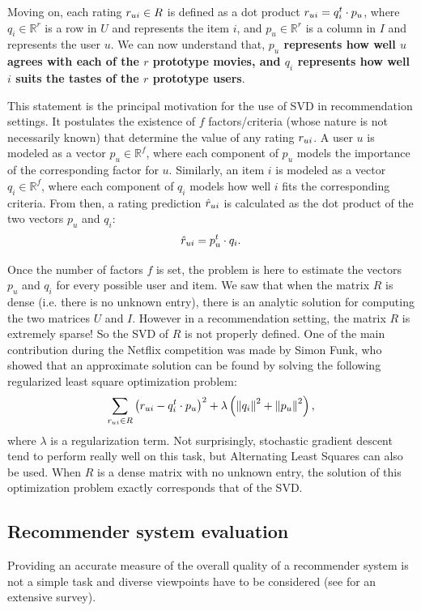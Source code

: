 Moving on, each rating $r_{ui} \in R$ is defined as a dot product $r_{ui} = q_i^t
\cdot p_u$, where $q_i \in \mathbb{R}^r$ is a row in $U$ and represents the
item $i$, and $p_u \in \mathbb{R}^r$ is a column in $I$ and represents the user
$u$. We can now understand that, \textbf{$p_u$ represents how well $u$ agrees
with each of the $r$ prototype movies, and $q_i$ represents how well $i$ suits
the tastes of the $r$ prototype users}.

This statement is the principal motivation for the use of SVD in recommendation
settings. It postulates the existence of $f$ factors/criteria (whose nature is
not necessarily known) that determine the value of any rating $r_{ui}$.  A user
$u$ is modeled as a vector $p_u \in \mathbb{R}^f$, where each component of
$p_u$ models the importance of the corresponding factor for $u$.  Similarly, an
item $i$ is modeled as a vector $q_i \in \mathbb{R}^f$, where each component of
$q_i$ models how well $i$ fits the corresponding criteria.  From then, a rating
prediction $\hat{r}_{ui}$ is calculated as the dot product of the two vectors $p_u$
and $q_i$:
$$\hat{r}_{ui} = p_u^t \cdot q_i.$$

Once the number of factors $f$ is set, the problem is here to estimate the
vectors $p_u$ and $q_i$ for every possible user and item. We saw that when the
matrix $R$ is dense (i.e. there is no unknown entry), there is an analytic
solution for computing the two matrices $U$ and $I$. However in a
recommendation setting, the matrix $R$ is extremely sparse! So the SVD of $R$
is not properly defined. One of the main contribution during the Netflix
competition was made by Simon Funk, who showed that an approximate solution can
be found by solving the following regularized least square optimization
problem:
$$
\sum_{r_{ui} \in R} \left(r_{ui} - q_i^t \cdot p_u \right)^2 +
\lambda\left({\left\lVert q_i\right\rVert}_{}^2 + {\left\lVert p_u\right\rVert}_{}^2\right),
$$
where $\lambda$ is a regularization term. Not surprisingly, stochastic gradient
descent tend to perform really well on this task, but Alternating Least Squares
can also be used. When $R$ is a dense matrix with no unknown entry, the
solution of this optimization problem exactly corresponds that of the SVD.


\subsection{Recommender system evaluation}
\label{SEC:Recommender_system_evaluation}
Providing an accurate measure of the overall quality of a recommender system is
not a simple task and diverse viewpoints have to be considered (see \cite[Ch.
??]{RecoSystemHandbook} for an extensive survey).

